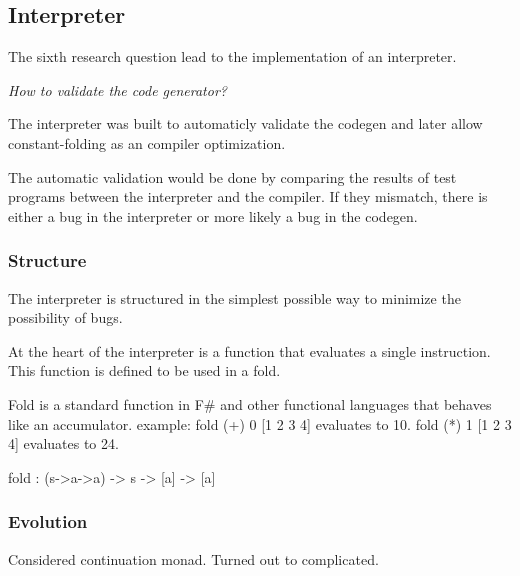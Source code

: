 \subsection{Interpreter}
The sixth research question lead to the implementation of an interpreter.

\textit{How to validate the code generator?}

The interpreter was built to automaticly validate the codegen and later allow constant-folding as an compiler optimization.

The automatic validation would be done by comparing the results of test programs between the interpreter and the compiler.
If they mismatch, there is either a bug in the interpreter or more likely a bug in the codegen.

\subsubsection{Structure}
The interpreter is structured in the simplest possible way to minimize the possibility of bugs.

At the heart of the interpreter is a function that evaluates a single instruction.
This function is defined to be used in a fold.

Fold is a standard function in F\# and other functional languages that behaves like an accumulator.
example: fold (+) 0 [1 2 3 4] evaluates to 10.
fold (*) 1 [1 2 3 4] evaluates to 24.

\begin{code}
    fold : (s->a->a) -> s -> [a] -> [a]
\end{code}

\subsubsection{Evolution}
Considered continuation monad.
Turned out to complicated.
